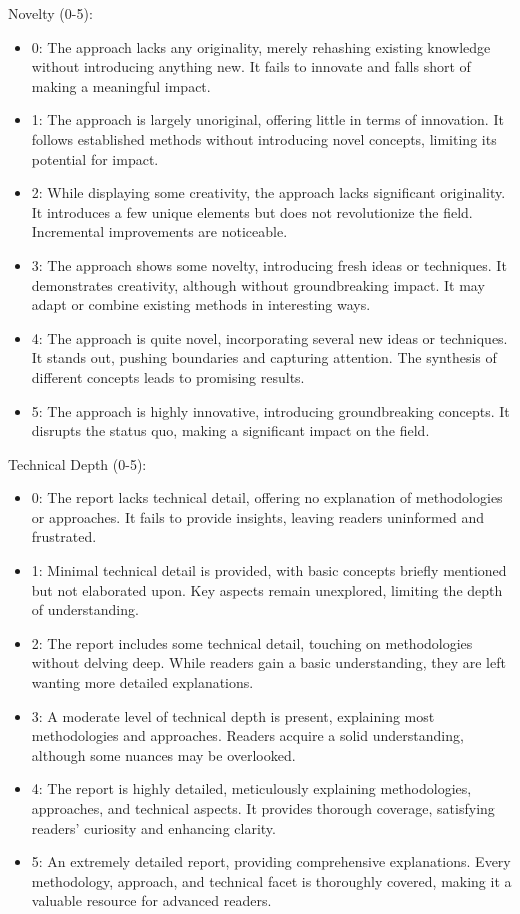 \documentclass[11pt,a4paper]{storm-ai_report}
\begin{document}
Novelty (0-5):
\begin{itemize}
    \item 0: The approach lacks any originality, merely rehashing existing knowledge without introducing anything new. It fails to innovate and falls short of making a meaningful impact.
    \item 1: The approach is largely unoriginal, offering little in terms of innovation. It follows established methods without introducing novel concepts, limiting its potential for impact.
    \item 2: While displaying some creativity, the approach lacks significant originality. It introduces a few unique elements but does not revolutionize the field. Incremental improvements are noticeable.
    \item 3: The approach shows some novelty, introducing fresh ideas or techniques. It demonstrates creativity, although without groundbreaking impact. It may adapt or combine existing methods in interesting ways.
    \item 4: The approach is quite novel, incorporating several new ideas or techniques. It stands out, pushing boundaries and capturing attention. The synthesis of different concepts leads to promising results.
    \item 5: The approach is highly innovative, introducing groundbreaking concepts. It disrupts the status quo, making a significant impact on the field.
\end{itemize}

Technical Depth (0-5):
\begin{itemize}
    \item 0: The report lacks technical detail, offering no explanation of methodologies or approaches. It fails to provide insights, leaving readers uninformed and frustrated.
    \item 1: Minimal technical detail is provided, with basic concepts briefly mentioned but not elaborated upon. Key aspects remain unexplored, limiting the depth of understanding.
    \item 2: The report includes some technical detail, touching on methodologies without delving deep. While readers gain a basic understanding, they are left wanting more detailed explanations.
    \item 3: A moderate level of technical depth is present, explaining most methodologies and approaches. Readers acquire a solid understanding, although some nuances may be overlooked.
    \item 4: The report is highly detailed, meticulously explaining methodologies, approaches, and technical aspects. It provides thorough coverage, satisfying readers’ curiosity and enhancing clarity.
    \item 5: An extremely detailed report, providing comprehensive explanations. Every methodology, approach, and technical facet is thoroughly covered, making it a valuable resource for advanced readers.
\end{itemize}
\end{document}
